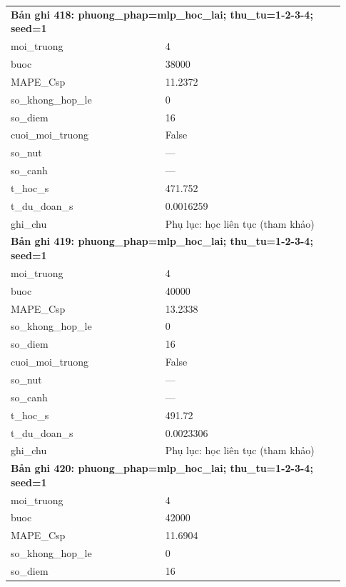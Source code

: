 \begin{longtable}{p{0.43\linewidth}p{0.50\linewidth}}
\midrule
\multicolumn{2}{p{0.95\linewidth}}{\textbf{Bản ghi 418: phuong\_phap=mlp\_hoc\_lai; thu\_tu=1-2-3-4; seed=1}} \\
moi\_\allowbreak truong & 4 \\
buoc & 38000 \\
MAPE\_\allowbreak Csp & 11.2372 \\
so\_\allowbreak khong\_\allowbreak hop\_\allowbreak le & 0 \\
so\_\allowbreak diem & 16 \\
cuoi\_\allowbreak moi\_\allowbreak truong & False \\
so\_\allowbreak nut & — \\
so\_\allowbreak canh & — \\
t\_\allowbreak hoc\_\allowbreak s & 471.752 \\
t\_\allowbreak du\_\allowbreak doan\_\allowbreak s & 0.0016259 \\
ghi\_\allowbreak chu & Phụ lục: học liên tục (tham khảo) \\
\midrule
\multicolumn{2}{p{0.95\linewidth}}{\textbf{Bản ghi 419: phuong\_phap=mlp\_hoc\_lai; thu\_tu=1-2-3-4; seed=1}} \\
moi\_\allowbreak truong & 4 \\
buoc & 40000 \\
MAPE\_\allowbreak Csp & 13.2338 \\
so\_\allowbreak khong\_\allowbreak hop\_\allowbreak le & 0 \\
so\_\allowbreak diem & 16 \\
cuoi\_\allowbreak moi\_\allowbreak truong & False \\
so\_\allowbreak nut & — \\
so\_\allowbreak canh & — \\
t\_\allowbreak hoc\_\allowbreak s & 491.72 \\
t\_\allowbreak du\_\allowbreak doan\_\allowbreak s & 0.0023306 \\
ghi\_\allowbreak chu & Phụ lục: học liên tục (tham khảo) \\
\midrule
\multicolumn{2}{p{0.95\linewidth}}{\textbf{Bản ghi 420: phuong\_phap=mlp\_hoc\_lai; thu\_tu=1-2-3-4; seed=1}} \\
moi\_\allowbreak truong & 4 \\
buoc & 42000 \\
MAPE\_\allowbreak Csp & 11.6904 \\
so\_\allowbreak khong\_\allowbreak hop\_\allowbreak le & 0 \\
so\_\allowbreak diem & 16 \\

\end{longtable}
